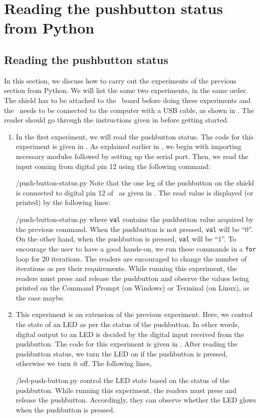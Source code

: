 \section{Reading the pushbutton status from Python}
\subsection{Reading the pushbutton status}
In this section, we discuss how to carry out the experiments of the
previous section from Python.  We will list the same two experiments,
in the same order.  The shield has to be attached to the \arduino\ board
before doing these experiments and the \arduino\ needs to be connected to the computer 
with a USB cable, as shown in .
The reader should go through the instructions given in
 before getting started.

\begin{enumerate}
\item In the first experiment, we will read the pushbutton status. The code for this experiment is given in
  . As explained earlier in , we begin with 
  importing necessary modules followed by setting up the serial port. 
  Then, we read the input coming from digital pin 12 using the
  following command:
  
  {\LocPushpycode/push-button-status.py} Note that the one leg of the pushbutton on
  the shield is connected to digital pin 12 of \arduino\, 
  as given in . The read value is displayed (or printed) 
 by the following lines: 
   
  {\LocPushpycode/push-button-status.py} where {\tt val} contains
  the pushbutton value acquired by the previous command. When the pushbutton is not pressed, {\tt val} will be ``0''. On the other hand,
  when the pushbutton is pressed, {\tt val} will be ``1''.
  To encourage the user to have a good hands-on, we run these commands in
  a {\tt for} loop for 20 iterations. The readers are encouraged to change the number 
  of iterations as per their requirements. While running this experiment, the readers must press
  and release the pushbutton and observe the values being printed on the
  Command Prompt (on Windows) or Terminal (on Linux), as the case maybe.


\item This experiment is an extension of the previous
  experiment. Here, we control the state of an LED as per the status
  of the pushbutton. In other words, digital output to an LED is
  decided by the digital input received from the pushbutton. The code
  for this experiment is given in . After reading
  the pushbutton status, we turn the LED on if the pushbutton is
  pressed, otherwise we turn it off. The following lines,
  
  {\LocPushpycode/led-push-button.py} control the LED state based on the status 
  of the pushbutton. While running this experiment, the readers must press and release the 
  pushbutton. Accordingly, they can observe whether the LED glows when the pushbutton is pressed.
\end{enumerate}

